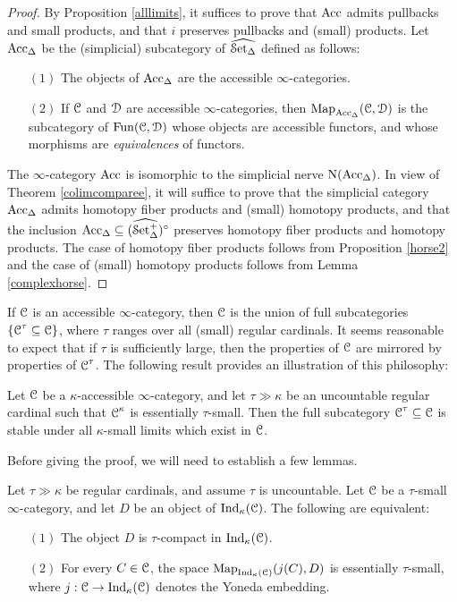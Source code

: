\begin{proof}
By Proposition \ref{alllimits}, it suffices to prove that $\operatorname{Acc}$ admits pullbacks and small products, and that $i$ preserves pullbacks and (small) products. Let $\operatorname{Acc}_{\Delta}$ be the (simplicial) subcategory of $\widehat{\operatorname{\mathcal{S}et_{\Delta}}}$ defined as follows:
\begin{itemize}
\item[$(1)$] The objects of $\operatorname{Acc}_{\Delta}$ are the accessible $\infty$-categories.
\item[$(2)$] If $\operatorname{\mathcal{C}}$ and $\operatorname{\mathcal{D}}$ are accessible $\infty$-categories, then
$\operatorname{{Map}}_{ \operatorname{Acc}_{\Delta} }( \operatorname{\mathcal{C}}, \operatorname{\mathcal{D}})$ is the subcategory of $\operatorname{Fun}(\operatorname{\mathcal{C}},\operatorname{\mathcal{D}})$ whose
objects are accessible functors, and whose morphisms are {\em equivalences} of functors.
\end{itemize}
The $\infty$-category $\operatorname{Acc}$ is isomorphic to the simplicial nerve
$\operatorname{N}( \operatorname{Acc}_{\Delta} )$. 
In view of Theorem \ref{colimcomparee}, it will suffice to prove that the simplicial category $\operatorname{Acc}_{\Delta}$ admits homotopy fiber products
and (small) homotopy products, and that the inclusion $\operatorname{Acc}_{\Delta} \subseteq
( \widehat{\operatorname{\mathcal{S}et_{\Delta}^{+}}} )^{\circ}$ preserves
homotopy fiber products and homotopy products. The case of homotopy fiber products follows from Proposition \ref{horse2} and the case of (small) homotopy products follows from Lemma \ref{complexhorse}.
\end{proof}

If $\operatorname{\mathcal{C}}$ is an accessible $\infty$-category, then $\operatorname{\mathcal{C}}$ is the union of full subcategories
$\{ \operatorname{\mathcal{C}}^{\tau} \subseteq \operatorname{\mathcal{C}} \}$, where $\tau$ ranges over all (small) regular cardinals. It seems reasonable to expect that if $\tau$ is sufficiently large, then the properties of $\operatorname{\mathcal{C}}$ are mirrored by properties of $\operatorname{\mathcal{C}}^{\tau}$. The following result provides an illustration of this philosophy:

\begin{proposition}\label{tcoherent}
Let $\operatorname{\mathcal{C}}$ be a $\kappa$-accessible $\infty$-category, and let $\tau \gg \kappa$ be an uncountable regular cardinal such that $\operatorname{\mathcal{C}}^{\kappa}$ is essentially $\tau$-small. Then the full subcategory $\operatorname{\mathcal{C}}^{\tau} \subseteq \operatorname{\mathcal{C}}$ is stable under all $\kappa$-small limits which exist in $\operatorname{\mathcal{C}}$.
\end{proposition}

Before giving the proof, we will need to establish a few lemmas.

\begin{lemma}\label{thinman}
Let $\tau \gg \kappa$ be regular cardinals, and assume $\tau$ is uncountable. 
Let $\operatorname{\mathcal{C}}$ be a $\tau$-small $\infty$-category, and let $D$ be an object of $\operatorname{Ind}_{\kappa}(\operatorname{\mathcal{C}})$. The following are equivalent:
\begin{itemize}
\item[$(1)$] The object $D$ is $\tau$-compact in $\operatorname{Ind}_{\kappa}(\operatorname{\mathcal{C}})$. 
\item[$(2)$] For every $C \in \operatorname{\mathcal{C}}$, the space
$\operatorname{{Map}}_{\operatorname{Ind}_{\kappa}(\operatorname{\mathcal{C}})}(j(C),D)$ is essentially $\tau$-small, where
$j: \operatorname{\mathcal{C}} \rightarrow \operatorname{Ind}_{\kappa}(\operatorname{\mathcal{C}})$ denotes the Yoneda embedding.
\end{itemize}
\end{lemma}

